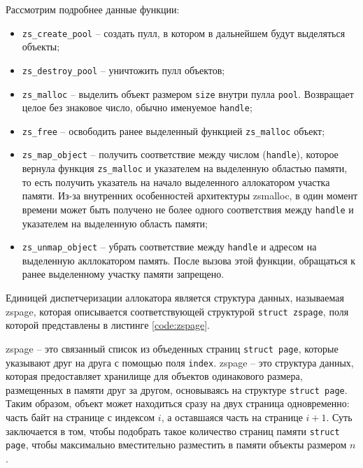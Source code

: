 
Рассмотрим подробнее данные функции:

\begin{itemize}
	\item \texttt{zs\_create\_pool} -- создать пулл, в котором в дальнейшем будут выделяться объекты;
	\item \texttt{zs\_destroy\_pool} -- уничтожить пулл объектов;
	\item \texttt{zs\_malloc} -- выделить объект размером \texttt{size} внутри пулла \texttt{pool}. Возвращает целое без знаковое число, обычно именуемое \texttt{handle};
	\item \texttt{zs\_free} -- освободить ранее выделенный функцией \texttt{zs\_malloc} объект;
	\item \texttt{zs\_map\_object} -- получить соответствие между числом (\texttt{handle}), которое вернула функция \texttt{zs\_malloc} и указателем на выделенную областью памяти, то есть получить указатель на начало выделенного аллокатором участка памяти. Из-за внутренних особенностей архитектуры zsmalloc, в один момент времени может быть получено не более одного соответствия между \texttt{handle} и указателем на выделенную область памяти;
	\item \texttt{zs\_unmap\_object} -- убрать соответствие между \texttt{handle} и адресом на выделенную акллокатором память. После вызова этой функции, обращаться к ранее выделенному участку памяти запрещено. 
\end{itemize}

Единицей диспетчеризации аллокатора является структура данных, называемая zspage, которая описывается соответствующей структурой \texttt{struct zspage}, поля которой представлены в листинге \ref{code:zspage}. 


zspage -- это связанный список из объеденных страниц \texttt{struct page}, которые указывают друг на друга с помощью поля \texttt{index}. zspage -- это структура данных, которая предоставляет хранилище для объектов одинакового размера, размещенных в памяти друг за другом, основываясь на структуре \texttt{struct page}. Таким образом, объект может находиться сразу на двух страница одновременно: часть байт на странице с индексом $i$, а оставшаяся часть на странице $i + 1$. Суть заключается в том, чтобы подобрать такое количество страниц памяти \texttt{struct page}, чтобы максимально вместительно разместить в памяти объекты размером $n$.

